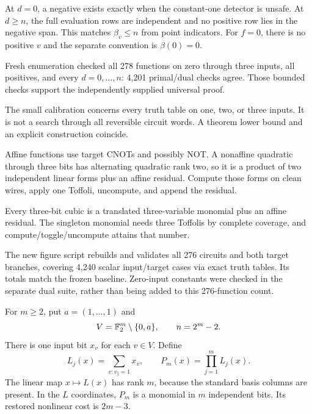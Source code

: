 At $d=0$, a negative exists exactly when the constant-one detector is unsafe.
At $d\ge n$, the full evaluation rows are independent and no positive row
lies in the negative span. This matches $\beta_v\le n$ from point indicators.
For $f=0$, there is no positive $v$ and the separate convention is $\beta(0)=0$.

Fresh enumeration checked all 278 functions on zero through three inputs,
all positives, and every $d=0,\ldots,n$: 4,201 primal/dual checks agree.
Those bounded checks support the independently supplied universal proof.


The small calibration concerns every truth table on one, two, or three
inputs. It is not a search through all reversible circuit words. A theorem
lower bound and an explicit construction coincide.


Affine functions use target CNOTs and possibly NOT. A nonaffine quadratic
through three bits has alternating quadratic rank two, so it is a product
of two independent linear forms plus an affine residual. Compute those
forms on clean wires, apply one Toffoli, uncompute, and append the residual.

Every three-bit cubic is a translated three-variable monomial plus an
affine residual. The singleton monomial needs three Toffolis by complete
coverage, and compute/toggle/uncompute attains that number.

The new figure script rebuilds and validates all 276 circuits and both target
branches, covering 4,240 scalar input/target cases via exact truth tables.
Its totals match the frozen baseline. Zero-input constants were checked in
the separate dual suite, rather than being added to this 276-function count.


For $m\ge2$, put $a=(1,\ldots,1)$ and
\[
 V=\mathbb F_2^m\setminus\{0,a\},\qquad n=2^m-2.
\]
There is one input bit $x_v$ for each $v\in V$. Define
\[
 L_j(x)=\sum_{v:v_j=1}x_v,\qquad
 P_m(x)=\prod_{j=1}^m L_j(x).
\]
The linear map $x\mapsto L(x)$ has rank $m$, because the standard basis
columns are present. In the $L$ coordinates, $P_m$ is a monomial in $m$
independent bits. Its restored nonlinear cost is $2m-3$.

